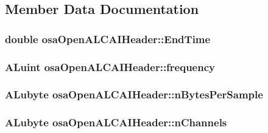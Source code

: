 \subsection{Member Data Documentation}
\hypertarget{structosa_open_a_l_c_a_i_header_a6b1dc8f15a496e97853553fe619e5708}{
\subsubsection[{End\-Time}]{\setlength{\rightskip}{0pt plus 5cm}double osa\-Open\-A\-L\-C\-A\-I\-Header\-::\-End\-Time}}\label{structosa_open_a_l_c_a_i_header_a6b1dc8f15a496e97853553fe619e5708}
\hypertarget{structosa_open_a_l_c_a_i_header_aaa90f7109f9686b0b3d1cfe440bb244a}{
\subsubsection[{frequency}]{\setlength{\rightskip}{0pt plus 5cm}A\-Luint osa\-Open\-A\-L\-C\-A\-I\-Header\-::frequency}}\label{structosa_open_a_l_c_a_i_header_aaa90f7109f9686b0b3d1cfe440bb244a}
\hypertarget{structosa_open_a_l_c_a_i_header_a6856804bf471be06e7f3382088f0815f}{
\subsubsection[{n\-Bytes\-Per\-Sample}]{\setlength{\rightskip}{0pt plus 5cm}A\-Lubyte osa\-Open\-A\-L\-C\-A\-I\-Header\-::n\-Bytes\-Per\-Sample}}\label{structosa_open_a_l_c_a_i_header_a6856804bf471be06e7f3382088f0815f}
\hypertarget{structosa_open_a_l_c_a_i_header_a244fe6df719466694ffc1ccc593d54d0}{
\subsubsection[{n\-Channels}]{\setlength{\rightskip}{0pt plus 5cm}A\-Lubyte osa\-Open\-A\-L\-C\-A\-I\-Header\-::n\-Channels}}\label{structosa_open_a_l_c_a_i_header_a244fe6df719466694ffc1ccc593d54d0}
